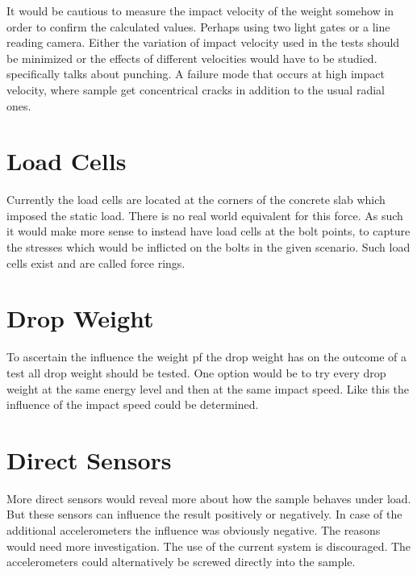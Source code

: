 It would be cautious to measure the impact velocity of the weight somehow in order to confirm the calculated values. Perhaps using two light gates or a line reading camera. Either the variation of impact velocity used in the tests should be minimized or the effects of different velocities would have to be studied. \autocite[25]{Erik15} specifically talks about punching. A failure mode that occurs at high impact velocity, where sample get concentrical cracks in addition to the usual radial ones.


\section{Load Cells}

Currently the load cells are located at the corners of the concrete slab which imposed the static load. There is no real world equivalent for this force. As such it would make more sense to instead have load cells at the bolt points, to capture the stresses which would be inflicted on the bolts in the given scenario. Such load cells exist and are called force rings.

\section{Drop Weight}

To ascertain the influence the weight pf the drop weight has on the outcome of a test all drop weight should be tested. One option would be to try every drop weight at the same energy level and then at the same impact speed. 
Like this the influence of the impact speed could be determined.

\section{Direct Sensors}

More direct sensors would reveal more about how the sample behaves under load. But these sensors can influence the result positively or negatively. In case of the additional accelerometers the influence was obviously negative. The reasons would need more investigation. The use of the current system is discouraged. The accelerometers could alternatively be screwed directly into the sample.

